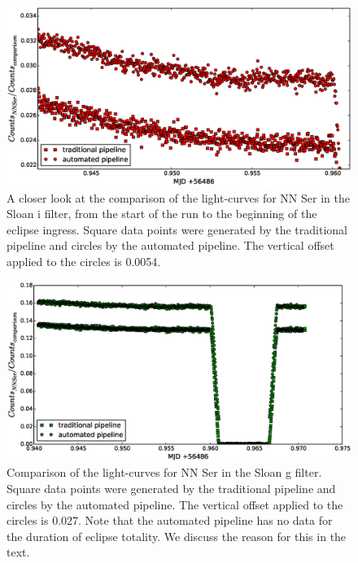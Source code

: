 \begin{figure}
\centering
\includegraphics[width=140mm]{images/nn_ser_compare_zoom_r.eps}
\caption{A closer look at the comparison of the light-curves for NN Ser in the Sloan i filter, from the start of the run to the beginning of the eclipse ingress. Square data points were generated by the traditional pipeline and circles by the automated pipeline. The vertical offset applied to the circles is 0.0054. }
\label{fig:comparepipelines_zoom_r}
\end{figure}

\begin{figure}
\centering
\includegraphics[width=140mm]{images/nn_ser_compare_g.eps}
\caption{Comparison of the light-curves for NN Ser in the Sloan g filter. Square data points were generated by the traditional pipeline and circles by the automated pipeline. The vertical offset applied to the circles is 0.027. Note that the automated pipeline has no data for the duration of eclipse totality. We discuss the reason for this in the text.}
\label{fig:comparepipelines_g}
\end{figure}

